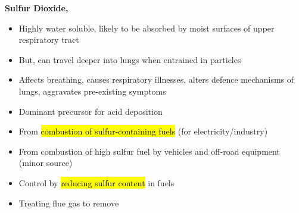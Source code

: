 \documentclass{article}
\newcommand{\headingsmall}[1]{{\small\textbf{#1}}}
\begin{document}
\begin{multicols*}{4}
\headingsmall{Sulfur Dioxide, }
\begin{itemize} \itemsep -0.5em
    \item Highly water soluble, likely to be absorbed by moist surfaces of upper 
        respiratory tract
    \item But, can travel deeper into lungs when entrained in particles
    \item Affects breathing, causes respiratory illnesses, alters defence
        mechanisms of lungs, aggravates pre-existing symptoms
    \item Dominant precursor for acid deposition
    \item From \hl{combustion of sulfur-containing fuels} (for electricity/industry)
    \item From combustion of high sulfur fuel by vehicles and off-road equipment
        (minor source)
    \item Control by \hl{reducing sulfur content} in fuels
    \item Treating flue gas to remove 
\end{itemize}


\end{multicols*}
\end{document}
